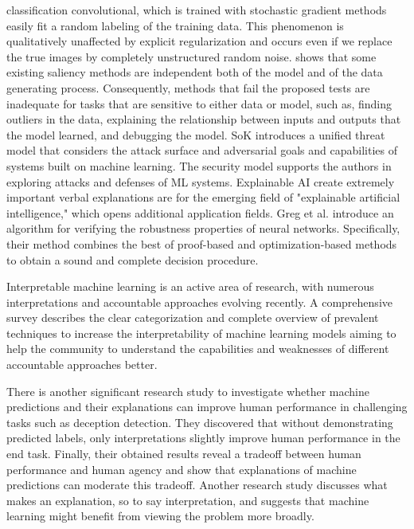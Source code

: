 classification convolutional, which is trained with stochastic gradient methods easily fit a random labeling of the training data. This phenomenon is qualitatively unaffected by explicit regularization and occurs even if we replace the true images by completely unstructured random noise. \cite{adebayo2018sanity} shows that some existing saliency methods are independent both of the model and of the data generating process. Consequently, methods that fail the proposed tests are inadequate for tasks that are sensitive to either data or model, such as, finding outliers in the data, explaining the relationship between inputs and outputs that the model learned, and debugging the model. SoK \cite{papernot2016towards} introduces a unified threat model that considers the attack surface and adversarial goals and capabilities of systems built on machine learning. The security model supports the authors in exploring attacks and defenses of ML systems. Explainable AI \cite{goebel2018explainable} create extremely important verbal explanations are for the emerging field of "explainable artificial intelligence," which opens additional application fields. Greg et al. \cite{anderson2019optimization} introduce an algorithm for verifying the robustness properties of neural networks. Specifically, their method combines the best of proof-based and optimization-based methods to obtain a sound and complete decision procedure. 

Interpretable machine learning is an active area of research, with numerous interpretations and accountable approaches evolving recently. A comprehensive survey \cite{du2018techniques} describes the clear categorization and complete overview of prevalent techniques to increase the interpretability of machine learning models aiming to help the community to understand the capabilities and weaknesses of different accountable approaches better.

There is another significant research study \cite{lai2018human} to investigate whether machine predictions and their explanations can improve human performance in challenging tasks such as deception detection. They discovered that without demonstrating predicted labels, only interpretations slightly improve human performance in the end task. Finally, their obtained results reveal a tradeoff between human performance and human agency and show that explanations of machine predictions can moderate this tradeoff. Another research study \cite{yang2019learn} discusses what makes an explanation, so to say interpretation, and suggests that machine learning might benefit from viewing the problem more broadly.
